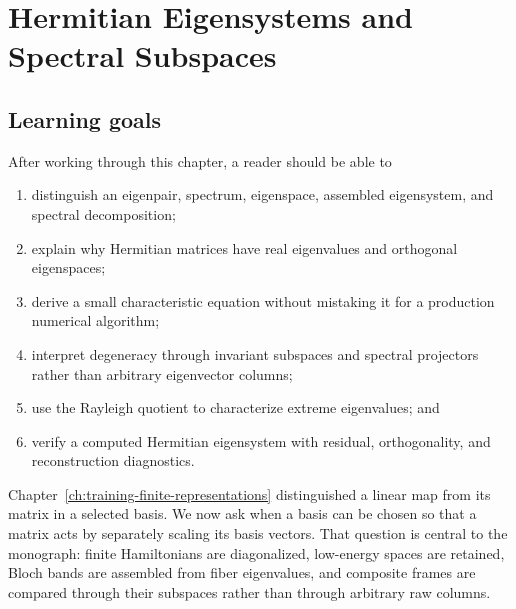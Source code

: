 \chapter{Hermitian Eigensystems and Spectral Subspaces}

\label{ch:training-hermitian-eigensystems}


\section{Learning goals}

After working through this chapter, a reader should be able to

\begin{enumerate}
  \item distinguish an eigenpair, spectrum, eigenspace, assembled eigensystem,
        and spectral decomposition;
  \item explain why Hermitian matrices have real eigenvalues and orthogonal
        eigenspaces;
  \item derive a small characteristic equation without mistaking it for a
        production numerical algorithm;
  \item interpret degeneracy through invariant subspaces and spectral
        projectors rather than arbitrary eigenvector columns;
  \item use the Rayleigh quotient to characterize extreme eigenvalues; and
  \item verify a computed Hermitian eigensystem with residual, orthogonality,
        and reconstruction diagnostics.
\end{enumerate}

Chapter~\ref{ch:training-finite-representations} distinguished a linear map
from its matrix in a selected basis. We now ask when a basis can be chosen so
that a matrix acts by separately scaling its basis vectors. That question is
central to the monograph: finite Hamiltonians are diagonalized, low-energy
spaces are retained, Bloch bands are assembled from fiber eigenvalues, and
composite frames are compared through their subspaces rather than through
arbitrary raw columns.

